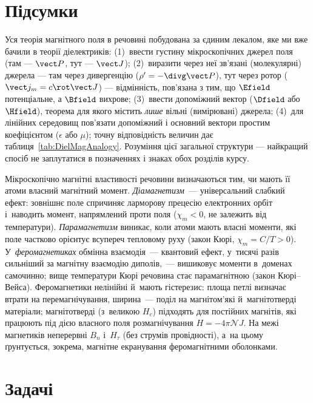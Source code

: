 \section*{Підсумки}
{}

Уся теорія магнітного поля в речовині побудована за єдиним лекалом, яке ми вже бачили в теорії діелектриків: (1)~ввести густину
мікроскопічних джерел поля (там --- $\vect P$, тут --- $\vect J$); (2)~виразити через неї зв'язані (молекулярні) джерела --- там через
дивергенцію ($\rho' = -\divg\vect P$), тут через ротор ($\vect j_m = c\rot\vect J$) --- відмінність, пов'язана з тим, що $\Efield$ потенціальне, а $\Bfield$ вихрове; (3)~ввести допоміжний вектор ($\Dfield$ або $\Hfield$), теорема для якого містить \emph{лише} вільні
(вимірювані) джерела; (4)~для лінійних середовищ пов'язати допоміжний і основний вектори простим коефіцієнтом ($\epsilon$ або $\mu$); точну відповідність величин дає таблиця~\ref{tab:DielMagAnalogy}. Розуміння
цієї загальної структури --- найкращий спосіб не заплутатися в позначеннях і знаках обох розділів курсу.

Мікроскопічно магнітні властивості речовини визначаються тим, чи мають її атоми власний магнітний момент. \emph{Діамагнетизм}~---
універсальний слабкий ефект: зовнішнє поле спричиняє ларморову прецесію електронних орбіт і~наводить момент, напрямлений проти поля
($\chi_m<0$, не залежить від температури). \emph{Парамагнетизм} виникає, коли атоми мають власні моменти, які поле частково орієнтує
всупереч тепловому руху (закон Кюрі, $\chi_m=C/T>0$). У~\emph{феромагнетиках} обмінна взаємодія~--- квантовий ефект, у~тисячі разів
сильніший за магнітну взаємодію диполів,~--- вишиковує моменти в~доменах самочинно; вище температури Кюрі речовина стає парамагнітною
(закон Кюрі--Вейса). Феромагнетики нелінійні й~мають гістерезис: площа петлі визначає втрати на перемагнічування, ширина~--- поділ на
магнітом'які й~магнітотверді матеріали; магнітотверді (з~великою $H_c$) підходять для постійних магнітів, які працюють під дією власного поля розмагнічування $H=-4\pi\mathcal NJ$. На межі магнетиків неперервні $B_n$ і~$H_\tau$ (без струмів провідності), а~на цьому
ґрунтується, зокрема, магнітне екранування феромагнітними оболонками.

\section*{Задачі}
{}

